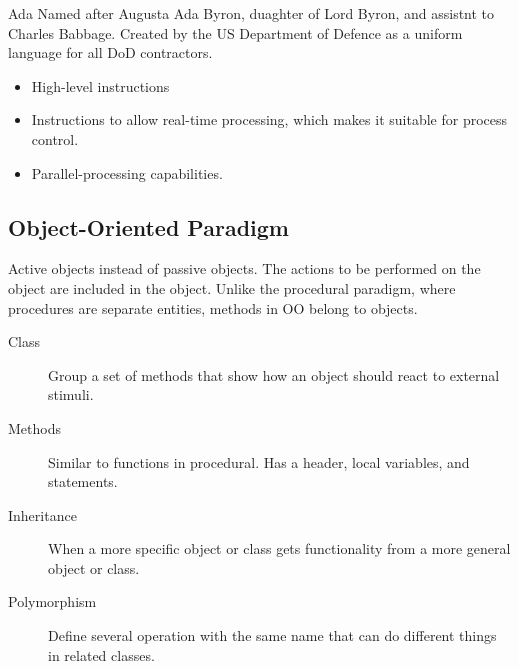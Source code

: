 \documentclass[\main/notes.tex]{subfiles}
\begin{document}
					\begin{definition}{Ada}
						Named after Augusta Ada Byron, duaghter of Lord Byron, and assistnt to Charles Babbage. Created by the US Department of Defence as a uniform language for all DoD contractors.
						\begin{itemize}[nosep]
							\item High-level instructions
							\item Instructions to allow real-time processing, which makes it suitable for process control.
							\item Parallel-processing capabilities.
						\end{itemize}
					\end{definition}
			\subsection{Object-Oriented Paradigm}
				Active objects instead of passive objects. The actions to be performed on the object are included in the object. Unlike the procedural paradigm, where procedures are separate entities, methods in OO belong to objects.
				\begin{indentparagraph}
					\begin{description}
						\item[Class] Group a set of methods that show how an object should react to external stimuli.
						\item[Methods] Similar to functions in procedural. Has a header, local variables, and statements.
						\item[Inheritance] When a more specific object or class gets functionality from a more general object or class.
						\item[Polymorphism] Define several operation with the same name that can do different things in related classes.
					\end{description}
				\end{indentparagraph}
\end{document}
